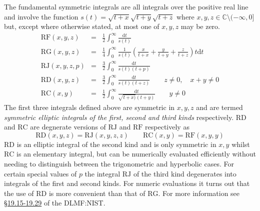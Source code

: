 The fundamental symmetric integrals are all integrals over the positive real
line and involve the function $s(t)=\sqrt{t+x}\sqrt{t+y}\sqrt{t+z}$ where
$x,y,z\in \mathbb{C} \setminus(-\infty, 0]$ but, except where otherwise stated, at most
one of $x,y,z$ may be zero.
\begin{eqnarray*}
\mathrm{RF}(x,y,z) & = & \frac{1}{2}\int_0^\infty \frac{\mathrm{d}t}{s(t)}\\
\mathrm{RG}(x,y,z) & = & \frac{1}{4}\int_0^\infty \frac{1}{s(t)}\left(
     \frac{x}{t+x}+\frac{y}{t+y}+\frac{z}{t+z}\right)t\mathrm{d}t\\
\mathrm{RJ}(x,y,z,p) & = & \frac{3}{2}\int_0^\infty \frac{\mathrm{d}t}{s(t)(t+p)}\\
\mathrm{RD}(x,y,z) & = & \frac{3}{2}\int_0^\infty \frac{\mathrm{d}t}{s(t)(t+z)}
\qquad z \neq 0, \quad x+y \neq 0\\
\mathrm{RC}(x,y) & = & \frac{1}{2}\int_0^\infty\frac{\mathrm{d}t}{\sqrt{t+x)}(t+y)}\qquad y \neq 0
\end{eqnarray*}
The first three integrals defined above are symmetric in $x,y,z$ and are termed
\emph{symmetric elliptic integrals of the first, second and third kinds}
respectively. $\mathrm{RD}$ and $\mathrm{RC}$ are degnerate versions of
$\mathrm{RJ}$ and $\mathrm{RF}$ respectively as
\[\mathrm{RD}(x,y,z) =\mathrm{RJ}(x,y,z,z) \qquad
\mathrm{RC}(x,y) =\mathrm{RF}(x,y,y) \]
$\mathrm{RD}$ is an elliptic integral of the second kind and is only symmetric
in $x,y$ whilst $\mathrm{RC}$ is an elementary integral, but can be numerically
evaluated efficiently without needing to distinguish between the trigonometric
and hyperbolic cases. For certain special values of $p$ the integral
$\mathrm{RJ}$ of the third kind degenerates into integrals of the first and
second kinds. For numeric evaluations it turns out that the use of $\mathrm{RD}$
is more convenient than that of $\mathrm{RG}$. For more information see
\href{https://dlmf.nist.gov/19#PT3}{\S19.15-19.29} of the DLMF:NIST.

